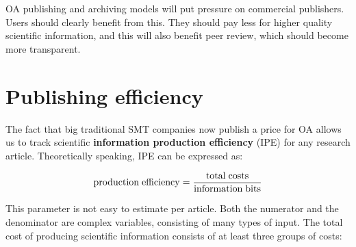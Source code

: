 \documentclass[graybox,envcountchap,sectrefs,UStrade]{svmono}
\begin{document}
OA publishing and archiving models will put pressure on commercial publishers. Users should clearly benefit from this. They should pay less for higher quality scientific information, and this will also benefit peer review, which should become more transparent.\par


\section{Publishing efficiency}

The fact that big traditional SMT companies now publish a price for OA allows us to track scientific \textbf{information production efficiency} (IPE) for any research article. Theoretically speaking, IPE can be expressed as:

\begin{equation}\label{E:info.production}
    {\rm production} \; {\rm efficiency} = \frac{{\rm total} \; {\rm costs}}{{\rm information} \; {\rm bits}}
\end{equation}

This parameter is not easy to estimate per article. Both the numerator and the denominator are complex variables, consisting of many types of input. The total cost of producing scientific information consists of at least three groups of costs:
\end{document}
